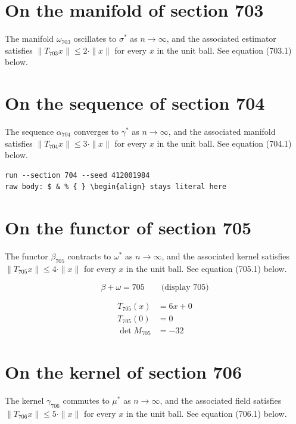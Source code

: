 \documentclass{article}
\begin{document}
\section{On the manifold of section 703}
The manifold $\omega_{703}$ oscillates to $\sigma^{*}$ as $n \to \infty$,
and the associated estimator satisfies $\|T_{703} x\| \leq 2 \cdot \|x\|$
for every $x$ in the unit ball. See equation (703.1) below.

\section{On the sequence of section 704}
The sequence $\alpha_{704}$ converges to $\gamma^{*}$ as $n \to \infty$,
and the associated manifold satisfies $\|T_{704} x\| \leq 3 \cdot \|x\|$
for every $x$ in the unit ball. See equation (704.1) below.

\begin{verbatim}
run --section 704 --seed 412001984
raw body: $ & % { } \begin{align} stays literal here
\end{verbatim}

\section{On the functor of section 705}
The functor $\beta_{705}$ contracts to $\omega^{*}$ as $n \to \infty$,
and the associated kernel satisfies $\|T_{705} x\| \leq 4 \cdot \|x\|$
for every $x$ in the unit ball. See equation (705.1) below.

$$
\beta + \omega = 705 \qquad \text{(display 705)}
$$

\begin{align}
T_{705}(x) &= 6 x + 0 \\
T_{705}(0) &= 0 \\
\det M_{705} &= -32
\end{align}

\section{On the kernel of section 706}
The kernel $\gamma_{706}$ commutes to $\mu^{*}$ as $n \to \infty$,
and the associated field satisfies $\|T_{706} x\| \leq 5 \cdot \|x\|$
for every $x$ in the unit ball. See equation (706.1) below.
\end{document}
